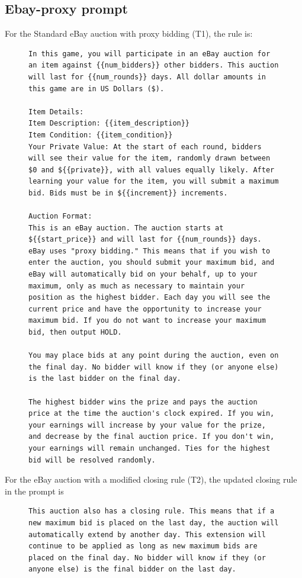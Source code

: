 \documentclass[acmsmall,screen,review]{acmart}
\begin{document}
\subsection{Ebay-proxy prompt}
For the Standard eBay auction with proxy bidding (T1), the rule is:
\begin{figure}[htbp]
\centering
\begin{minipage}{0.95\textwidth}
\begin{lstlisting}
In this game, you will participate in an eBay auction for an item against {{num_bidders}} other bidders. This auction will last for {{num_rounds}} days. All dollar amounts in this game are in US Dollars ($).

Item Details:
Item Description: {{item_description}}
Item Condition: {{item_condition}}
Your Private Value: At the start of each round, bidders will see their value for the item, randomly drawn between $0 and ${{private}}, with all values equally likely. After learning your value for the item, you will submit a maximum bid. Bids must be in ${{increment}} increments.

Auction Format:
This is an eBay auction. The auction starts at ${{start_price}} and will last for {{num_rounds}} days. eBay uses "proxy bidding." This means that if you wish to enter the auction, you should submit your maximum bid, and eBay will automatically bid on your behalf, up to your maximum, only as much as necessary to maintain your position as the highest bidder. Each day you will see the current price and have the opportunity to increase your maximum bid. If you do not want to increase your maximum bid, then output HOLD.

You may place bids at any point during the auction, even on the final day. No bidder will know if they (or anyone else) is the last bidder on the final day.

The highest bidder wins the prize and pays the auction price at the time the auction's clock expired. If you win, your earnings will increase by your value for the prize, and decrease by the final auction price. If you don't win, your earnings will remain unchanged. Ties for the highest bid will be resolved randomly.
\end{lstlisting}
\end{minipage}
\label{fig:sealbid_prompt-7}
\end{figure}


For the eBay auction with a modified closing rule (T2), the updated closing rule in the prompt is

\begin{figure}[htbp]
\centering
\begin{minipage}{0.95\textwidth}
\begin{lstlisting}
This auction also has a closing rule. This means that if a new maximum bid is placed on the last day, the auction will automatically extend by another day. This extension will continue to be applied as long as new maximum bids are placed on the final day. No bidder will know if they (or anyone else) is the final bidder on the last day.
\end{lstlisting}
\end{minipage}
\label{fig:sealbid_prompt-8}
\end{figure}
\end{document}
